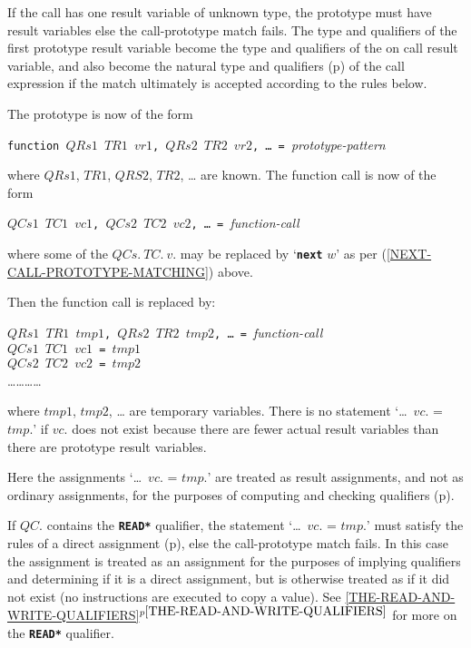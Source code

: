 \documentclass[12pt]{article}
\makeatletter
\newcommand{\TT}[1]{{\tt \bfseries #1}}
\newcommand{\ttamkey}[2]{\TT{*#1*}\index{#1@{\tt *#1*}!#2}}
\newcommand{\itemref}[1]{\ref{#1}$^{p\pageref{#1}}$}
\newcommand{\pagref}[1]{p\pageref{#1}}
\newenvironment{indpar}[1][0.3in]%
	{\begin{list}{}%
		     {\setlength{\itemsep}{0in}%
		      \setlength{\topsep}{0in}%
		      \setlength{\parsep}{1ex}%
		      \setlength{\labelwidth}{#1}%
		      \setlength{\leftmargin}{#1}%
		      \addtolength{\leftmargin}{\labelsep}}%
	 \item}%
	{\end{list}}
\makeatother
\begin{document}
\begin{enumerate}
\item If the call has one result variable of
unknown type, the prototype must have result variables
else the call-prototype match fails.
The type and qualifiers of the first
prototype result variable become the
type and qualifiers of the on call result variable, and also become the
natural
type and qualifiers (\pagref{NATURAL-TYPE})
of the call expression if
the match ultimately is accepted according to the rules below.

\item \label{FUNCTION-CALL-ASSIGNMENT-COMPILATION}
The prototype is now of the form
\begin{center}
{\tt function $QRs1$ $TR1$ $vr1$, $QRs2$ $TR2$ $vr2$,
     \ldots{}~=~}{\em prototype-pattern}
\end{center}
where $QRs1$, $TR1$, $QRS2$, $TR2$, \ldots{} are known.
The function call is now of the form
\begin{center}
{\tt $QCs1$ $TC1$ $vc1$, $QCs2$ $TC2$ $vc2$, \ldots{}~=~}{\em function-call}
\end{center}
where some of the $QCs.~TC.~v.$ may be replaced by `\TT{next} $w$' as per
(\ref{NEXT-CALL-PROTOTYPE-MATCHING}) above.

Then the function call is replaced by:
\begin{indpar}
{\tt $QRs1$ $TR1$ $tmp1$, $QRs2$ $TR2$ $tmp2$,
    \ldots{}~=~}{\em function-call} \\
{\tt $QCs1$ $TC1$ $vc1$ = $tmp1$} \\
{\tt $QCs2$ $TC2$ $vc2$ = $tmp2$} \\
\ldots\ldots\ldots\ldots
\end{indpar}
where $tmp1$, $tmp2$, \ldots{} are temporary variables.  There is
no statement `\ldots~$vc.$ = $tmp.$' if $vc.$ does not exist because
there are fewer actual result variables than there are prototype result
variables.

Here the assignments `\ldots~$vc.$ = $tmp.$' are treated as
result assignments, and not as ordinary assignments,
for the purposes of computing and checking qualifiers
(\pagref{DIRECT-ASSIGNMENT}).

If $QC.$ contains the \ttamkey{READ}{in call-prototype match}
qualifier, the statement
`\ldots~$vc.$ = $tmp.$' must satisfy the rules of a direct
assignment (\pagref{DIRECT-ASSIGNMENT}), else the call-prototype
match fails.  In this case the assignment is treated as an
assignment for the purposes of implying qualifiers and determining
if it is a direct assignment, but is otherwise treated as if it did
not exist (no instructions are executed to copy a value).
See \itemref{THE-READ-AND-WRITE-QUALIFIERS}
for more on the \TT{*READ*} qualifier.


\end{enumerate}
\end{document}
